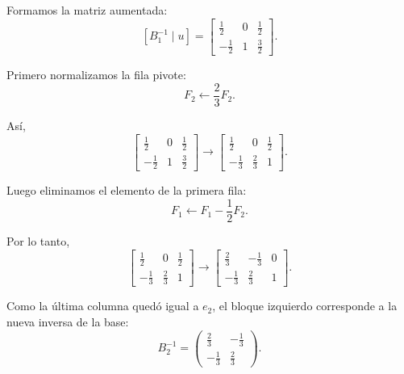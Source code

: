 \begin{enumerate}
Formamos la matriz aumentada:
\begin{equation}
\left[
B_1^{-1}\mid u
\right]
=
\left[
\begin{array}{cc|c}
\frac{1}{2} & 0 & \frac{1}{2}\\
-\frac{1}{2} & 1 & \frac{3}{2}
\end{array}
\right].
\end{equation}

Primero normalizamos la fila pivote:
\begin{equation}
F_2 \leftarrow \frac{2}{3}F_2.
\end{equation}

Así,
\begin{equation}
\left[
\begin{array}{cc|c}
\frac{1}{2} & 0 & \frac{1}{2}\\
-\frac{1}{2} & 1 & \frac{3}{2}
\end{array}
\right]
\longrightarrow
\left[
\begin{array}{cc|c}
\frac{1}{2} & 0 & \frac{1}{2}\\
-\frac{1}{3} & \frac{2}{3} & 1
\end{array}
\right].
\end{equation}

Luego eliminamos el elemento de la primera fila:
\begin{equation}
F_1 \leftarrow F_1-\frac{1}{2}F_2.
\end{equation}

Por lo tanto,
\begin{equation}
\left[
\begin{array}{cc|c}
\frac{1}{2} & 0 & \frac{1}{2}\\
-\frac{1}{3} & \frac{2}{3} & 1
\end{array}
\right]
\longrightarrow
\left[
\begin{array}{cc|c}
\frac{2}{3} & -\frac{1}{3} & 0\\
-\frac{1}{3} & \frac{2}{3} & 1
\end{array}
\right].
\end{equation}

Como la última columna quedó igual a $e_2$, el bloque izquierdo corresponde a
la nueva inversa de la base:
\begin{equation}
B_2^{-1}
=
\begin{pmatrix}
\frac{2}{3} & -\frac{1}{3}\\
-\frac{1}{3} & \frac{2}{3}
\end{pmatrix}.
\end{equation}


\end{enumerate}
